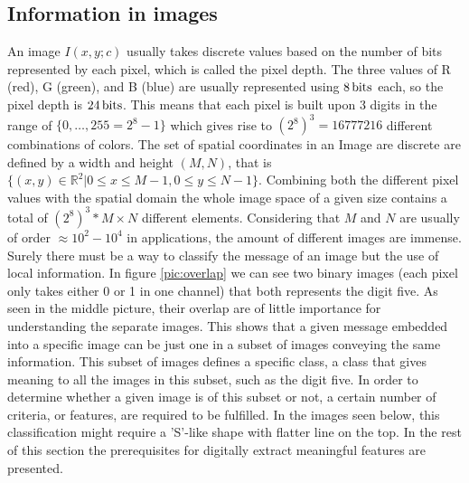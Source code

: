 \subsection{Information in images}

An image $I(x,y;c)$ usually takes discrete values based on the number of bits represented by each pixel, which is called the pixel depth. The three values of R (red), G (green), and B (blue) are usually represented using $\unit[8]{bits}$ each, so the pixel depth is $\unit[24]{bits}$. This means that each pixel is built upon 3 digits in the range of $\{0,\ldots,255=2^8-1\}$ which gives rise to $(2^8)^3=16777216$ different combinations of colors. The set of spatial coordinates in an Image are discrete are defined by a width and height $(M,N)$, that is $\{(x,y)\in \mathbb{R}^2 | 0 \leq x \leq M-1, 0 \leq y \leq N-1 \}$. Combining both the different pixel values with the spatial domain the whole image space of a given size contains a total of $(2^8)^3*M \times N$ different elements. Considering that $M$ and $N$ are usually of order $\approx 10^2 - 10^4$ in applications, the amount of different images are immense. Surely there must be a way to classify the message of an image but the use of local information. In figure \ref{pic:overlap} we can see two binary images (each pixel only takes either 0 or 1 in one channel) that both represents the digit five. As seen in the middle picture, their overlap are of little importance for understanding the separate images. This shows that a given message embedded into a specific image can be just one in a subset of images conveying the same information. This subset of images defines a specific class, a class that gives meaning to all the images in this subset, such as the digit five. In order to determine whether a given image is of this subset or not, a certain number of criteria, or features, are required to be fulfilled. In the images seen below, this classification might require a 'S'-like shape with flatter line on the top. In the rest of this section the prerequisites for digitally extract meaningful features are presented.

